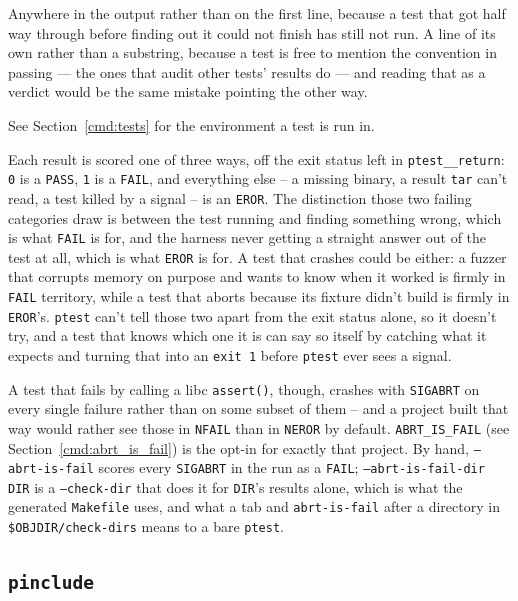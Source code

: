 \documentclass{article}
\begin{document}
Anywhere in the output rather than on the first line, because a test
that got half way through before finding out it could not finish has
still not run.  A line of its own rather than a substring, because a
test is free to mention the convention in passing --- the ones that
audit other tests' results do --- and reading that as a verdict would
be the same mistake pointing the other way.

See Section~\ref{cmd:tests} for the environment a test is run in.

Each result is scored one of three ways, off the exit status left in
\texttt{ptest\_\_return}: \texttt{0} is a \texttt{PASS}, \texttt{1} is
a \texttt{FAIL}, and everything else -- a missing binary, a result
\texttt{tar} can't read, a test killed by a signal -- is an
\texttt{EROR}.  The distinction those two failing categories draw is
between the test running and finding something wrong, which is what
\texttt{FAIL} is for, and the harness never getting a straight answer
out of the test at all, which is what \texttt{EROR} is for.  A test
that crashes could be either: a fuzzer that corrupts memory on
purpose and wants to know when it worked is firmly in \texttt{FAIL}
territory, while a test that aborts because its fixture didn't build
is firmly in \texttt{EROR}'s.  \texttt{ptest} can't tell those two
apart from the exit status alone, so it doesn't try, and a test that
knows which one it is can say so itself by catching what it expects
and turning that into an \texttt{exit 1} before \texttt{ptest} ever
sees a signal.

A test that fails by calling a libc \texttt{assert()}, though,
crashes with \texttt{SIGABRT} on every single failure rather than on
some subset of them -- and a project built that way would rather see
those in \texttt{NFAIL} than in \texttt{NEROR} by default.
\texttt{ABRT\_IS\_FAIL} (see Section~\ref{cmd:abrt_is_fail}) is the
opt-in for exactly that project.  By hand, \texttt{--abrt-is-fail}
scores every \texttt{SIGABRT} in the run as a \texttt{FAIL};
\texttt{--abrt-is-fail-dir DIR} is a \texttt{--check-dir} that does
it for \texttt{DIR}'s results alone, which is what the generated
\texttt{Makefile} uses, and what a tab and \texttt{abrt-is-fail}
after a directory in \texttt{\$OBJDIR/check-dirs} means to a bare
\texttt{ptest}.

\subsection{\texttt{pinclude} \label{prog:pinclude}}
\end{document}
